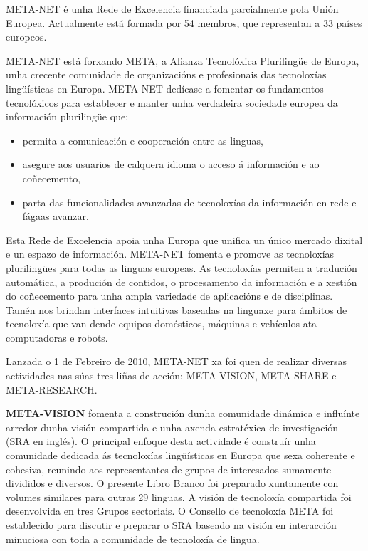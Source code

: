 \begin{multicols}{2}

META-NET é unha Rede de Excelencia financiada parcialmente  pola Unión Europea. Actualmente está formada por 54 membros, que representan a 33 países europeos\cite{rehm2011}.
   
META-NET está forxando META, a Alianza Tecnolóxica Plurilingüe de Europa, unha crecente comunidade de organizacións e profesionais das tecnoloxías lingüísticas en Europa. META-NET dedícase a fomentar os fundamentos tecnolóxicos para establecer e manter unha verdadeira sociedade europea da información plurilingüe que:

\begin{itemize}
	\item permita a comunicación e cooperación entre as linguas, 
	\item asegure aos usuarios de calquera idioma o acceso á información e ao coñecemento,
	\item parta das funcionalidades avanzadas de tecnoloxías da información en rede e fágaas avanzar. 
\end{itemize}

 Esta Rede de Excelencia apoia unha Europa que unifica un único mercado dixital e un espazo de información. META-NET fomenta e promove as tecnoloxías plurilingües para todas as linguas europeas. As tecnoloxías permiten a tradución automática, a produción de contidos, o procesamento da información e a xestión do coñecemento para unha ampla variedade de aplicacións e de disciplinas. Tamén nos brindan interfaces intuitivas baseadas na linguaxe para ámbitos de tecnoloxía que van dende equipos domésticos, máquinas e vehículos ata computadoras e robots. 

Lanzada o 1 de Febreiro de 2010, META-NET xa foi quen de realizar diversas actividades nas súas tres liñas de acción: META-VISION, META-SHARE  e  META-RESEARCH.

\textbf{META-VISION} fomenta a construción dunha comunidade dinámica e influínte arredor dunha visión compartida e unha axenda estratéxica de investigación (SRA en inglés). O principal enfoque desta actividade é construír unha comunidade dedicada ás tecnoloxías lingüísticas en Europa que sexa coherente e cohesiva, reunindo aos representantes de grupos de interesados sumamente divididos e diversos. O presente Libro Branco foi preparado xuntamente con volumes similares para outras 29 linguas. A visión de tecnoloxía compartida foi desenvolvida en tres Grupos  sectoriais. O Consello de tecnoloxía META foi establecido para discutir e preparar o SRA baseado na visión en interacción minuciosa con toda a  comunidade de tecnoloxía de lingua.


\end{multicols}
